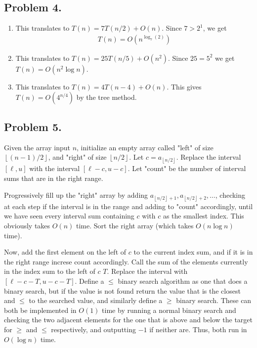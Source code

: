 \documentclass[12pt]{article}
\theoremstyle{definitionstyle}
\newcommand{\floor}[1]{\left\lfloor#1\right\rfloor}
\begin{document}
    \subsection*{Problem 4.} 
    \begin{enumerate}[label=\alph*)]
        \item This translates to $T(n) = 7T(n/2) + O(n)$. Since $7 > 2^1$, we get 
        \begin{align*}
            T(n) = O(n^{\log_7(2)})
        \end{align*}
        
        \item This translates to $T(n) = 25T(n/5) + O(n^2)$. Since $25 = 5^2$ we get $T(n) = O(n^2\log n)$.
        \item This translates to $T(n) = 4T(n-4) + O(n)$. This gives $T(n) = O(4^{n/4})$ by the tree method.
    \end{enumerate}

    \subsection*{Problem 5.}
    Given the array input $n$, initialize an empty array called "left" of size $\floor{(n-1)/2}$, and "right" of size $\floor{n/2}$. Let $c = a_{\floor{n/2}}$. Replace the interval $[\ell, u]$ with the interval $[\ell-c, u-c]$. Let "count" be the number of interval sums that are in the right range. 
    
    Progressively fill up the "right" array by adding $a_{\floor{n/2}+1}, a_{\floor{n/2}+2}, \ldots$, checking at each step if the interval is in the range and adding to "count" accordingly, until we have seen every interval sum containing $c$ with $c$ as the smallest index. This obviously takes $O(n)$ time. Sort the right array (which takes $O(n\log n)$ time). 
    
    Now, add the first element on the left of $c$ to the current index sum, and if it is in the right range increse count accordingly. Call the sum of the elements currently in the index sum to the left of $c$ $T$. Replace the interval with $[\ell-c-T, u-c-T]$. Define a $\leq$ binary search algorithm as one that does a binary search, but if the value is not found return the value that is the closest and $\leq$ to the searched value, and similarly define a $\geq$ binary search. These can both be implemented in $O(1)$ time by running a normal binary search and checking the two adjacent elements for the one that is above and below the target for $\geq$ and $\leq$ respectively, and outputting $-1$ if neither are. Thus, both run in $O(\log n)$ time.
    
\end{document}
